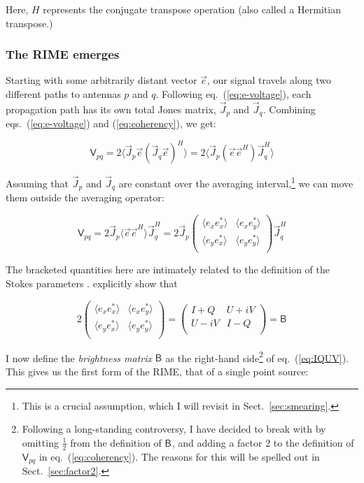 \documentclass[]{aa}
\newcommand{\matrixtt}[4]{\left( \begin{array}{cc}#1&#2\\#3&#4\\\end{array} \right)}
\newcommand{\herm}{H}
\newcommand{\jones}[2]{\vec {#1}_{#2}}
\newcommand{\jonesT}[2]{\vec {#1}^{\herm}_{#2}}
\newcommand{\coh}[2]{\mathsf{{#1}}_{{#2}}}
\begin{document}
Here, $\herm$ represents the conjugate transpose operation (also called a Hermitian transpose.)

\subsubsection{\label{sec:RIME-emerges}The RIME emerges}

Starting with some arbitrarily distant vector $\vec e$, our signal travels along two different paths to antennas $p$ and $q$. Following eq.~(\ref{eq:e-voltage}), each propagation path has its own total Jones matrix, $\jones{J}{p}$ and $\jones{J}{q}$. Combining eqs.~(\ref{eq:e-voltage}) and (\ref{eq:coherency}), we get:

    \begin{equation}\label{eq:corr1}
    \coh{V}{pq} = 2 \langle  \jones{J}{p} \vec e ( \jones{J}{q} \vec e )^\herm \rangle  = 2 \langle  \jones{J}{p} (\vec e \vec e^\herm) \jonesT{J}{q} \rangle 
    \end{equation}

Assuming that $\jones{J}{p}$ and $\jones{J}{q}$ are constant over the averaging interval,\footnote{This is a crucial assumption, which I will revisit in Sect.~\ref{sec:smearing}.} we can move them outside the averaging operator:

    \begin{equation}\label{eq:corr2}
    \coh{V}{pq} = 2 \jones{J}{p} \langle  \vec e \vec e^\herm \rangle  \jonesT{J}{q} = 
    2 \jones{J}{p} 
    \matrixtt{\langle e_x e^*_x\rangle }{\langle e_x e^*_y\rangle }{\langle e_y e^*_x\rangle }{\langle e_y e^*_y\rangle }
    \jonesT{J}{q}
    \end{equation}

The bracketed quantities here are intimately related to the definition of the Stokes parameters \citep{born-wolf,tms}. \citet{ME3} explicitly show that

    \begin{equation}\label{eq:IQUV}
    2 
    \matrixtt{\langle e_x e^*_x\rangle }{\langle e_x e^*_y\rangle }{\langle e_y e^*_x\rangle }{\langle e_y e^*_y\rangle }
    = 
    \matrixtt{I+Q}{U+iV}{U-iV}{I-Q} = \coh{B}{}
    \end{equation}

I now define the {\em brightness matrix} $\coh{B}{}$ as the right-hand side\footnote{Following a long-standing controversy, I have decided to break with \citet{ME4} by omitting $\frac{1}{2}$ from the definition of $\coh{B}{}$, and adding a factor 2 to the definition of $\coh{V}{pq}$ in eq.~(\ref{eq:coherency}). The reasons for this will be spelled out in Sect.~\ref{sec:factor2}.} of eq.~(\ref{eq:IQUV}). This gives us the first form of the RIME, that of a single point source:
\end{document}
